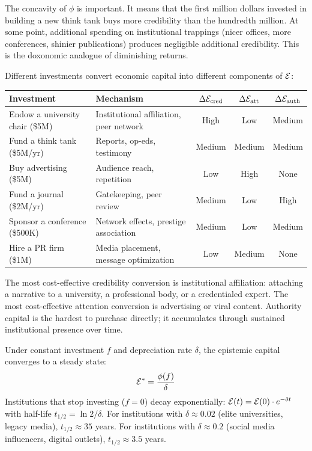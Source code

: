 The concavity of $\phi$ is important.
It means that the first million dollars invested in building a new think tank buys more credibility than the hundredth million.
At some point, additional spending on institutional trappings (nicer offices, more conferences, shinier publications) produces negligible additional credibility.
This is the doxonomic analogue of diminishing returns.

\begin{example}
\label{ex:conversion-pathways}
Different investments convert economic capital into different components of $\mathcal{E}$:

\begin{center}
\begin{tabular}{lp{6cm}ccc}
\toprule
\textbf{Investment} & \textbf{Mechanism} & $\Delta\mathcal{E}_{\text{cred}}$ & $\Delta\mathcal{E}_{\text{att}}$ & $\Delta\mathcal{E}_{\text{auth}}$ \\
\midrule
Endow a university chair (\$5M) & Institutional affiliation, peer network & High & Low & Medium \\
Fund a think tank (\$5M/yr) & Reports, op-eds, testimony & Medium & Medium & Medium \\
Buy advertising (\$5M) & Audience reach, repetition & Low & High & None \\
Fund a journal (\$2M/yr) & Gatekeeping, peer review & Medium & Low & High \\
Sponsor a conference (\$500K) & Network effects, prestige association & Medium & Low & Medium \\
Hire a PR firm (\$1M) & Media placement, message optimization & Low & Medium & None \\
\bottomrule
\end{tabular}
\end{center}

The most cost-effective credibility conversion is institutional affiliation: attaching a narrative to a university, a professional body, or a credentialed expert.
The most cost-effective attention conversion is advertising or viral content.
Authority capital is the hardest to purchase directly; it accumulates through sustained institutional presence over time.
\end{example}

\begin{proposition}
\label{prop:steady-state}
Under constant investment $f$ and depreciation rate $\delta$, the epistemic capital converges to a steady state:
\[
  \mathcal{E}^* = \frac{\phi(f)}{\delta}
\]
Institutions that stop investing ($f = 0$) decay exponentially: $\mathcal{E}(t) = \mathcal{E}(0) \cdot e^{-\delta t}$ with half-life $t_{1/2} = \ln 2 / \delta$.
For institutions with $\delta \approx 0.02$ (elite universities, legacy media), $t_{1/2} \approx 35$ years.
For institutions with $\delta \approx 0.2$ (social media influencers, digital outlets), $t_{1/2} \approx 3.5$ years.
\end{proposition}

